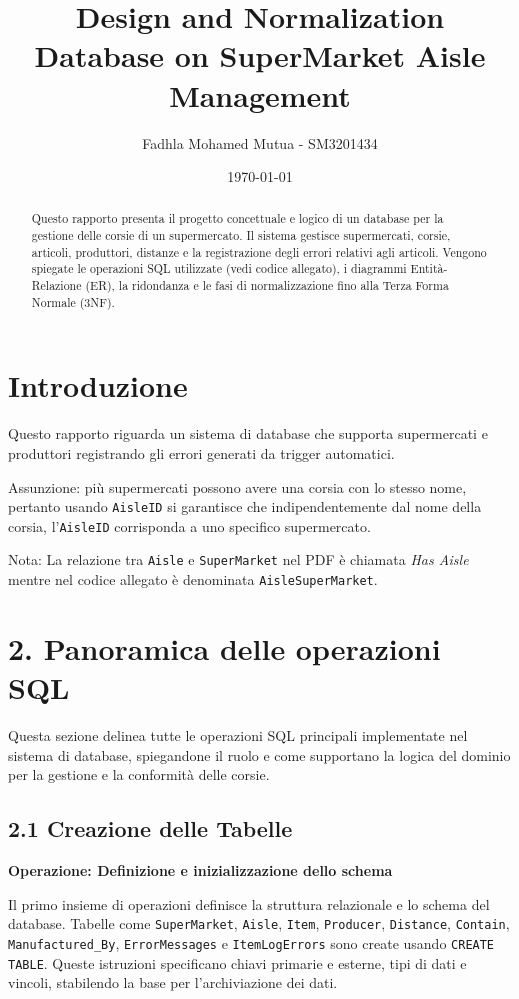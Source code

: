 \documentclass[a4paper,12pt]{article}
\title{Design and Normalization Database on SuperMarket Aisle Management}
\author{Fadhla Mohamed Mutua - SM3201434}
\date{\today}
\begin{document}
\maketitle

\begin{abstract}
Questo rapporto presenta il progetto concettuale e logico di un database per la gestione delle corsie di un supermercato. Il sistema gestisce supermercati, corsie, articoli, produttori, distanze e la registrazione degli errori relativi agli articoli. Vengono spiegate le operazioni SQL utilizzate (vedi codice allegato), i diagrammi Entità-Relazione (ER), la ridondanza e le fasi di normalizzazione fino alla Terza Forma Normale (3NF).
\end{abstract}

\newpage
\tableofcontents
\newpage

\section{Introduzione}
Questo rapporto riguarda un sistema di database che supporta supermercati e produttori registrando gli errori generati da trigger automatici.

Assunzione: più supermercati possono avere una corsia con lo stesso nome, pertanto usando \texttt{AisleID} si garantisce che indipendentemente dal nome della corsia, l'\texttt{AisleID} corrisponda a uno specifico supermercato.

Nota: La relazione tra \texttt{Aisle} e \texttt{SuperMarket} nel PDF è chiamata \textit{Has Aisle} mentre nel codice allegato è denominata \texttt{AisleSuperMarket}.

\section*{2. Panoramica delle operazioni SQL}

Questa sezione delinea tutte le operazioni SQL principali implementate nel sistema di database, spiegandone il ruolo e come supportano la logica del dominio per la gestione e la conformità delle corsie.

\subsection*{2.1 Creazione delle Tabelle}

\textbf{Operazione: Definizione e inizializzazione dello schema}

Il primo insieme di operazioni definisce la struttura relazionale e lo schema del database. Tabelle come \texttt{SuperMarket}, \texttt{Aisle}, \texttt{Item}, \texttt{Producer}, \texttt{Distance}, \texttt{Contain}, \texttt{Manufactured\_By}, \texttt{ErrorMessages} e \texttt{ItemLogErrors} sono create usando \texttt{CREATE TABLE}. Queste istruzioni specificano chiavi primarie e esterne, tipi di dati e vincoli, stabilendo la base per l’archiviazione dei dati.
\end{document}
